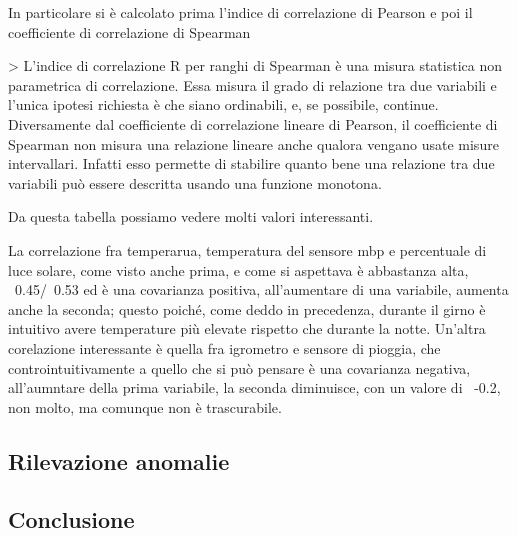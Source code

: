 \documentclass[a4paper, 12pt]{report}
\begin{document}
In particolare si è calcolato prima l'indice di correlazione di Pearson e poi il coefficiente di correlazione di Spearman

> L'indice di correlazione R per ranghi di Spearman è una misura statistica non parametrica di correlazione. 
Essa misura il grado di relazione tra due variabili e l'unica ipotesi richiesta è che siano ordinabili, e, se possibile, continue. 
Diversamente dal coefficiente di correlazione lineare di Pearson, il coefficiente di Spearman non misura una relazione lineare anche qualora vengano usate misure intervallari. 
Infatti esso permette di stabilire quanto bene una relazione tra due variabili può essere descritta usando una funzione monotona.



Da questa tabella possiamo vedere molti valori interessanti.

La correlazione fra temperarua, temperatura del sensore mbp e percentuale di luce solare, come visto anche prima, e come si aspettava è abbastanza alta, ~0.45/~0.53 ed è una 
covarianza positiva, all'aumentare di una variabile, aumenta anche la seconda; questo poiché, come deddo in precedenza, durante il girno è intuitivo avere temperature più elevate rispetto che durante la notte.
Un'altra corelazione interessante è quella fra igrometro e sensore di pioggia, che controintuitivamente a quello che si può pensare è una covarianza negativa, all'aumntare 
della prima variabile, la seconda diminuisce, con un valore di ~-0.2, non molto, ma comunque non è trascurabile.    

\subsection*{Rilevazione anomalie}
\vspace{0.5cm}

\subsection*{Conclusione}
\vspace{0.5cm}
\end{document}
